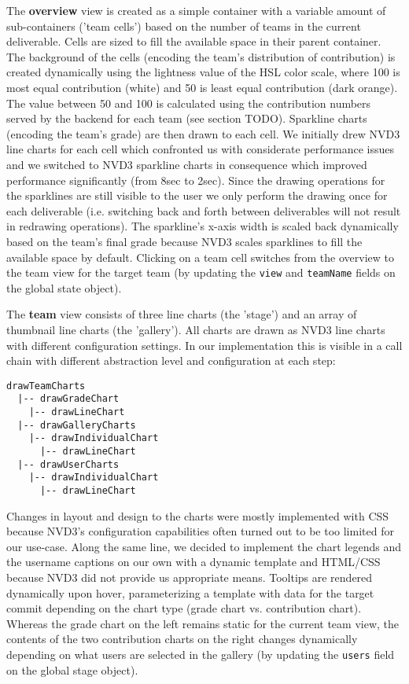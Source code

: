 \documentclass[../manifest.tex]{subfiles}
\begin{document}
The \textbf{overview} view is created as a simple container with a variable amount of sub-containers ('team cells') based on the number of teams in the current deliverable. Cells are sized to fill the available space in their parent container. The background of the cells (encoding the team's distribution of contribution) is created dynamically using the lightness value of the HSL color scale, where 100 is most equal contribution (white) and 50 is least equal contribution (dark orange). The value between 50 and 100 is calculated using the contribution numbers served by the backend for each team (see section TODO). Sparkline charts (encoding the team's grade) are then drawn to each cell. We initially drew NVD3 line charts for each cell which confronted us with considerate performance issues and we switched to NVD3 sparkline charts in consequence which improved performance significantly (from \texttildelow8sec to \texttildelow2sec). Since the drawing operations for the sparklines are still visible to the user we only perform the drawing once for each deliverable (i.e. switching back and forth between deliverables will not result in redrawing operations). The sparkline's x-axis width is scaled back dynamically based on the team's final grade because NVD3 scales sparklines to fill the available space by default. Clicking on a team cell switches from the overview to the team view for the target team (by updating the \texttt{view} and \texttt{teamName} fields on the global state object).

The \textbf{team} view consists of three line charts (the 'stage') and an array of thumbnail line charts (the 'gallery'). All charts are drawn as NVD3 line charts with different configuration settings. In our implementation this is visible in a call chain with different abstraction level and configuration at each step:
\begin{verbatim}
drawTeamCharts
  |-- drawGradeChart
    |-- drawLineChart
  |-- drawGalleryCharts
    |-- drawIndividualChart
      |-- drawLineChart
  |-- drawUserCharts
    |-- drawIndividualChart
      |-- drawLineChart
\end{verbatim}

Changes in layout and design to the charts were mostly implemented with CSS because NVD3's configuration capabilities often turned out to be too limited for our use-case. Along the same line, we decided to implement the chart legends and the username captions on our own with a dynamic template and HTML/CSS because NVD3 did not provide us appropriate means. Tooltips are rendered dynamically upon hover, parameterizing a template with data for the target commit depending on the chart type (grade chart vs. contribution chart). Whereas the grade chart on the left remains static for the current team view, the contents of the two contribution charts on the right changes dynamically depending on what users are selected in the gallery (by updating the \texttt{users} field on the global stage object).
\end{document}

